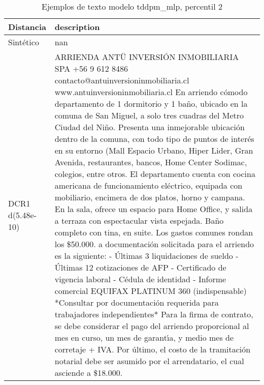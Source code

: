 \begin{table}[H]
\centering
\fontsize{10}{14}\selectfont
\caption{Ejemplos de texto modelo tddpm\_mlp, percentil 2}
\label{table-example-economicos-a-3-tddpm_mlp-2p-text}
\begin{tabular}{|l|m{35em}|}
\hline
\rowcolor[gray]{0.8}
Distancia & description \\
\hline Sintético & nan \\
\hline DCR1 d(5.48e-10) & ARRIENDA ANT\"U INVERSI\'ON INMOBILIARIA SPA +56 9 612 8486 contacto@antuinversioninmobiliaria.cl www.antuinversioninmobiliaria.cl  En arriendo c\'omodo departamento de 1 dormitorio y 1 ba\~no, ubicado en la comuna de San Miguel, a solo tres cuadras del Metro Ciudad del Ni\~no. Presenta una inmejorable ubicaci\'on dentro de la comuna, con todo tipo de puntos de inter\'es en su entorno (Mall Espacio Urbano, Hiper Lider, Gran Avenida, restaurantes, bancos, Home Center Sodimac, colegios, entre otros.  El departamento cuenta con cocina americana de funcionamiento el\'ectrico, equipada con mobiliario, encimera de dos platos, horno y campana. En la sala, ofrece un espacio para Home Office, y salida a terraza con espectacular vista espejada. Ba\~no completo con tina, en suite. Los gastos comunes rondan los \$50.000.  a documentaci\'on solicitada para el arriendo es la siguiente:  - \'Ultimas 3 liquidaciones de sueldo - \'Ultimas 12 cotizaciones de AFP - Certificado de vigencia laboral - C\'edula de identidad - Informe comercial EQUIFAX PLATINUM 360 (indispensable)  *Consultar por documentaci\'on requerida para trabajadores independientes*  Para la firma de contrato, se debe considerar el pago del arriendo proporcional al mes en curso, un mes de garant{\'\i}a, y medio mes de corretaje + IVA. Por \'ultimo, el costo de la tramitaci\'on notarial debe ser asumido por el arrendatario, el cual asciende a \$18.000. \\

\end{tabular}
\end{table}
